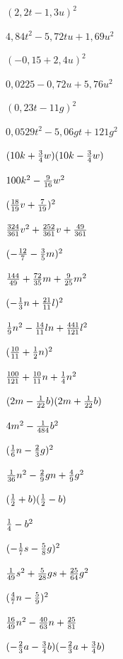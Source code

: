 \documentclass[
  ngerman,
]{book}
\begin{document}
\((2,2t-1,3u)^2\)

\leavevmode\hypertarget{toggleText81}{}%
\(4,84t^2-5,72tu+1,69u^2\)

\((-0,15+2,4u)^2\)

\leavevmode\hypertarget{toggleText82}{}%
\(0,0225-0,72u+5,76u^2\)

\((0,23t-11g)^2\)

\leavevmode\hypertarget{toggleText83}{}%
\(0,0529t^2-5,06gt+121g^2\)

\((10k+{3 \over 4}w)(10k-{3 \over 4}w)\)

\leavevmode\hypertarget{toggleText84}{}%
\(100k^2-{9 \over 16}w^2\)

\(({18 \over 19}v+{7 \over 19})^2\)

\leavevmode\hypertarget{toggleText85}{}%
\({324\over 361}v^2+{252 \over 361}v+{49 \over 361}\)

\((-{12 \over 7}-{3 \over 5}m)^2\)

\leavevmode\hypertarget{toggleText86}{}%
\({144 \over 49}+{72\over 35}m+{9 \over 25}m^2\)

\((-{1\over 3}n+{21 \over 11}l)^2\)

\leavevmode\hypertarget{toggleText87}{}%
\({1 \over 9}n^2 -{14 \over 11}ln + {441\over 121}l^2\)

\(({10 \over 11} + {1 \over 2}n)^2\)

\leavevmode\hypertarget{toggleText88}{}%
\({100 \over 121}+{10 \over 11}n+{1 \over 4}n^2\)

\((2m-{1\over 22}b)(2m+{1\over 22}b)\)

\leavevmode\hypertarget{toggleText89}{}%
\(4m^2-{1 \over 484}b^2\)

\(({1 \over 6}n-{2 \over 3}g)^2\)

\leavevmode\hypertarget{toggleText90}{}%
\({1 \over 36}n^2 - {2 \over 9}gn + {4 \over 9}g^2\)

\(({1 \over 2} +b)({1 \over 2}-b)\)

\leavevmode\hypertarget{toggleText91}{}%
\({1 \over 4}-b^2\)

\((-{1 \over 7}s-{5 \over 8}g)^2\)

\leavevmode\hypertarget{toggleText92}{}%
\({1 \over 49}s^2 + {5 \over 28}gs + {25 \over 64}g^2\)

\(({4 \over 7}n-{5 \over 9})^2\)

\leavevmode\hypertarget{toggleText93}{}%
\({16 \over 49}n^2-{40 \over 63}n+{25 \over 81}\)

\((-{2 \over 3}a-{3 \over 4}b)(-{2 \over 3}a+{3 \over 4}b)\)
\end{document}
